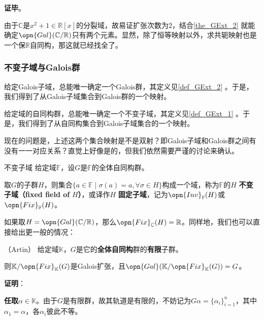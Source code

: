 \textbf{证毕}。



由于$\mathbb{C}$是$x^2+1\in\mathbb{R}[x]$的分裂域，故易证扩张次数为$2$，结合\autoref{the_GExt_2} 就能确定$\opn{Gal}(\mathbb{C}/\mathbb{R})$只有两个元素。显然，除了恒等映射以外，求共轭映射也是一个保$\mathbb{R}$自同构，那这就已经找全了。



\subsubsection{不变子域与Galois群}

给定Galois子域，总能唯一确定一个Galois群，其定义见\autoref{def_GExt_2} 。于是，我们得到了从Galois子域集合到Galois群的一个映射。

给定域的自同构群，总能唯一确定一个不变子域，其定义见\autoref{def_GExt_1} 。于是，我们得到了从自同构集合到Galois子域集合的一个映射。

现在的问题是，上述这两个集合映射是不是双射？即Galois子域和Galois群之间有没有一一对应关系？直觉上好像是的，但我们依然需要严谨的讨论来确认。



\begin{definition}{不变子域}\label{def_GExt_1}
给定域$\mathbb{F}$，设$G$是$\mathbb{F}$的全体自同构群。

取$G$的子群$H$，则集合$\{a\in\mathbb{F}\mid \sigma(a)=a, \forall \sigma\in H\}$构成一个域，称为$\mathbb{F}$的$H$ \textbf{不变子域（fixed field of }$H$\textbf{）}，或译作$H$ \textbf{固定子域}，记为$\opn{Inv}_\mathbb{F}(H)$或$\opn{Fix}_\mathbb{F}(H)$。
\end{definition}

如果取$H=\opn{Gal}(\mathbb{C}/\mathbb{R})$，那么$\opn{Fix}_{\mathbb{C}}(H)=\mathbb{R}$。同样地，我们也可以直接给出更一般的情况：



\begin{theorem}{（Artin）}\label{the_GExt_3}
给定域$\mathbb{K}$，$G$是它的\textbf{全体自同构}群的\textbf{有限}子群。

则$\mathbb{K}/\opn{Fix}_\mathbb{K}(G)$是Galois扩张，且$\opn{Gal}(\mathbb{K}/\opn{Fix}_\mathbb{K}(G))=G$。
\end{theorem}

\textbf{证明}：

\textbf{任取}$\alpha\in\mathbb{K}$。由于$G$是有限群，故其轨道是有限的，不妨记为$G\alpha=\{\alpha_i\}_{i=1}^n$，其中$\alpha_1=\alpha$，各$\alpha_i$彼此不等。

